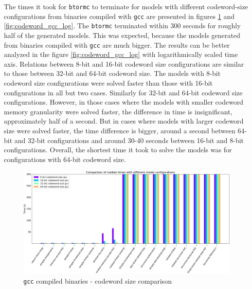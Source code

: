 \documentclass[12pt]{article}
\begin{document}
The times it took for \texttt{btormc} to terminate for models with different 
codeword-size configurations from binaries compiled with \texttt{gcc} are 
presented in figures \ref{fig:codeword_gcc_linear} and
\ref{fig:codeword_gcc_log}. The \texttt{btormc} terminated within 300 seconds
for roughly half of the generated models. This was expected, because the models
generated from binaries compiled with \texttt{gcc} are much bigger. The results
can be better analyzed in the figure \ref{fig:codeword_gcc_log} with
logarithmically scaled time axis. Relations between 8-bit and 16-bit codeword
size configurations are similar to those between 32-bit and 64-bit codeword
size. The models with 8-bit codeword size configurations were solved faster
than those with 16-bit configurations in all but two cases. Similarly for
32-bit and 64-bit codeword size configurations. However, in those cases where
the models with smaller codeword memory granularity were solved faster, the
difference in time is insignificant, approximately half of a second. But in
cases where models with larger codeword size were solved faster, the time
difference is bigger, around a second between 64-bit and 32-bit configurations
and around 30-40 seconds between 16-bit and 8-bit configurations. Overall, the
shortest time it took to solve the models was for configurations with 64-bit
codeword size.

\begin{figure}
    \includegraphics[width=\linewidth]{assets/benches/codeword_gcc_linear.png}
    \centering
    \caption{
        \texttt{gcc} compiled binaries - codeword size comparison
    }
    \label{fig:codeword_gcc_linear}
\end{figure}
\end{document}
